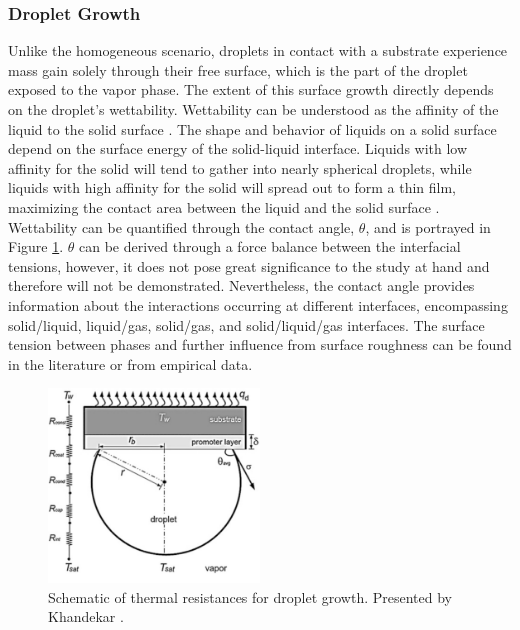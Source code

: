 \documentclass[12pt]{article}
\numberwithin{equation}{section}
\begin{document}
\subsubsection{Droplet Growth}\label{sss:Literature-Heterogeneous-Growth}
Unlike the homogeneous scenario, droplets in contact with a substrate experience mass gain solely through their free surface, which is the part of the droplet exposed to the vapor phase. The extent of this surface growth directly depends on the droplet's wettability. Wettability can be understood as the affinity of the liquid to the solid surface \cite{khandekar2020drop}. The shape and behavior of liquids on a solid surface depend on the surface energy of the solid-liquid interface. Liquids with low affinity for the solid will tend to gather into nearly spherical droplets, while liquids with high affinity for the solid will spread out to form a thin film, maximizing the contact area between the liquid and the solid surface \cite{khandekar2020drop}. Wettability can be quantified through the contact angle, $\theta$, and is portrayed in Figure \ref{f: dropwise growth}. $\theta$ can be derived through a force balance between the interfacial tensions, however, it does not pose great significance to the study at hand and therefore will not be demonstrated. Nevertheless, the contact angle provides information about the interactions occurring at different interfaces, encompassing solid/liquid, liquid/gas, solid/gas, and solid/liquid/gas interfaces. The surface tension between phases and further influence from surface roughness can be found in the literature \cite{doble2007perry,khandekar2020drop} or from empirical data. 
\begin{figure}[H]
    \centering
    \includegraphics[width=0.5\textwidth]{Figures/Dropwise_growth.pdf}
    \caption{Schematic of thermal resistances for droplet growth. Presented by Khandekar \cite{khandekar2020drop}.}
    \label{f: dropwise growth}
\end{figure}
\end{document}
